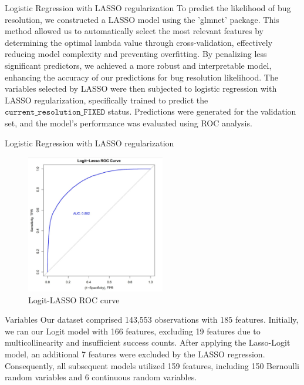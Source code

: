 \documentclass[10pt]{beamer}
\begin{document}
\begin{frame}[t]{Logistic Regression with LASSO regularization} \justifying \vspace{10pt}
	To predict the likelihood of bug resolution, we constructed a LASSO model using the 'glmnet' package. This method allowed us to automatically select the most relevant features by determining the optimal lambda value through cross-validation, effectively reducing model complexity and preventing overfitting. By penalizing less significant predictors, we achieved a more robust and interpretable model, enhancing the accuracy of our predictions for bug resolution likelihood.
	\vskip 16pt 
	The variables selected by LASSO were then subjected to logistic regression with LASSO regularization, specifically trained to predict the $\texttt{current\_resolution\_FIXED}$ status. Predictions were generated for the validation set, and the model's performance was evaluated using ROC analysis.
\end{frame}


\begin{frame}[t]{Logistic Regression with LASSO regularization}\justifying \vspace{1pt}
	\begin{figure}[htp]
		\centering
		\includegraphics[width=0.54\textwidth]{./Logit-Lasso_ROC.jpg}
		\caption{Logit-LASSO ROC curve}
		\label{fig:picture1}
	\end{figure}
\end{frame}


\begin{frame}[t]{Variables} \justifying \vspace{25pt}
	Our dataset comprised 143,553 observations with 185 features. Initially, we ran our Logit model with 166 features, excluding 19 features due to multicollinearity and insufficient success counts. After applying the Lasso-Logit model, an additional 7 features were excluded by the LASSO regression. Consequently, all subsequent models utilized 159 features, including 150 Bernoulli random variables and 6 continuous random variables. 
\end{frame}
\end{document}
